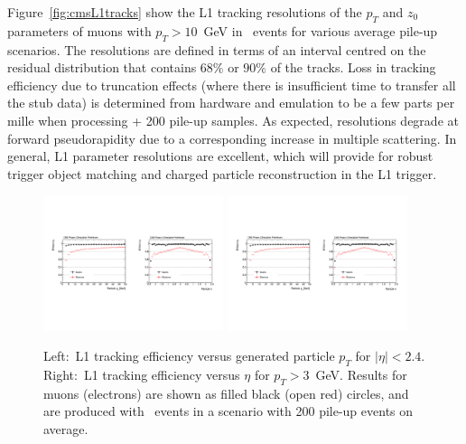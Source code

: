 Figure~\ref{fig:cmsL1tracks} show the L1 tracking resolutions of the $p_T$ and $z_0$ parameters of muons with $p_T>10$~GeV in \ttbar~events for various average pile-up scenarios. The resolutions are defined in terms of an interval
centred on the residual distribution that contains $68\%$ or $90\%$ of the tracks.
Loss in tracking efficiency due to truncation effects (where there is insufficient time to transfer all the stub data) is determined from hardware and emulation to be a few parts per mille when processing \ttbar + 200 pile-up samples.
As expected, resolutions degrade at forward pseudorapidity due to a corresponding increase in multiple scattering. 
In general, L1 parameter resolutions are excellent, which will provide for robust trigger object matching and charged particle reconstruction in the L1 trigger.

\begin{figure}[h!tbp]
\begin{center}
  \includegraphics[width=0.47\textwidth]{figures/cmsupgrade/TDR-17-001_fig6_6_a.pdf} \hfill
  \includegraphics[width=0.47\textwidth]{figures/cmsupgrade/TDR-17-001_fig6_6_b.pdf}
  \caption{ Left:~L1 tracking efficiency versus generated particle $p_T$ for $|\eta| < 2.4$.
	Right:~L1 tracking efficiency versus $\eta$ for $p_T > 3$~GeV. Results for muons (electrons) are shown as filled black (open red) circles, and are produced with \ttbar~events in a scenario with 200 pile-up events on average. }
  \label{fig:cmsL1lepton}
\end{center}
\end{figure}

